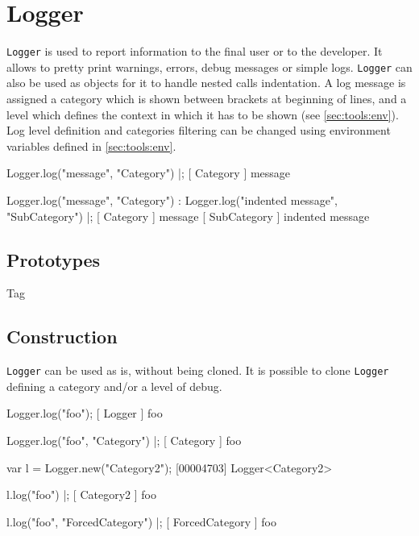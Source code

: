 
\section{Logger}

\lstinline|Logger| is used to report information to the final user or to the
developer. It allows to pretty print warnings, errors, debug messages or
simple logs. \lstinline|Logger| can also be used as  objects
for it to handle nested calls indentation. A log message is assigned a
category which is shown between brackets at beginning of lines, and a level
which defines the context in which it has to be shown (see
\autoref{sec:tools:env}). Log level definition and categories filtering can
be changed using environment variables defined in \autoref{sec:tools:env}.

\begin{urbiscript}
Logger.log("message", "Category") |;
[       Category        ] message

Logger.log("message", "Category") :
{
  Logger.log("indented message", "SubCategory")
}|;
[       Category        ] message
[      SubCategory      ]   indented message
\end{urbiscript}

\subsection{Prototypes}
\begin{refObjects}
\item[Tag]
\end{refObjects}

\subsection{Construction}

\lstinline|Logger| can be used as is, without being cloned. It is possible
to clone \lstinline|Logger| defining a category and/or a level of debug.

\begin{urbiscript}
Logger.log("foo");
[        Logger         ] foo

Logger.log("foo", "Category") |;
[       Category        ] foo

var l = Logger.new("Category2");
[00004703] Logger<Category2>

l.log("foo") |;
[       Category2       ] foo

l.log("foo", "ForcedCategory") |;
[    ForcedCategory     ] foo
\end{urbiscript}

